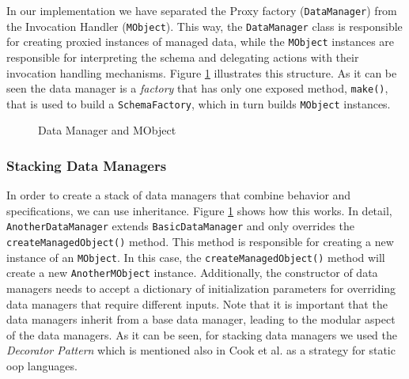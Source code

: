 In our implementation we have separated the Proxy factory (\texttt{DataManager}) from the Invocation Handler (\texttt{MObject}).
This way, the \texttt{DataManager} class is responsible for creating proxied instances of managed data, while the \texttt{MObject} instances are responsible for interpreting the schema and delegating actions with their invocation handling mechanisms. 
Figure \ref{fig:DataManager_and_MObject} illustrates this structure.
As it can be seen the data manager is a \textit{factory} that has only one exposed method, \texttt{make()}, that is used to build a \texttt{SchemaFactory}, which in turn builds \texttt{MObject} instances.

\begin{figure}[H]
	\centering
  	\caption{Data Manager and MObject}
  	\label{fig:DataManager_and_MObject}
\end{figure}

\subsubsection{Stacking Data Managers}
In order to create a stack of data managers that combine behavior and specifications, we can use inheritance.
Figure \ref{fig:DataManager_and_MObject} shows how this works.
In detail, \texttt{AnotherDataManager} extends \texttt{BasicDataManager} and only overrides the \texttt{createManagedObject()} method.
This method is responsible for creating a new instance of an \texttt{MObject}.
In this case, the \texttt{createManagedObject()} method will create a new \texttt{AnotherMObject} instance.
Additionally, the constructor of data managers needs to accept a dictionary of initialization parameters for overriding data managers that require different inputs.
Note that it is important that the data managers inherit from a base data manager, leading to the modular aspect of the data managers.
As it can be seen, for stacking data managers we used the \textit{Decorator Pattern} \cite{gamma1995design} which is mentioned also in Cook et al. \cite{loh2012managed} as a strategy for static \ac{oop} languages.

